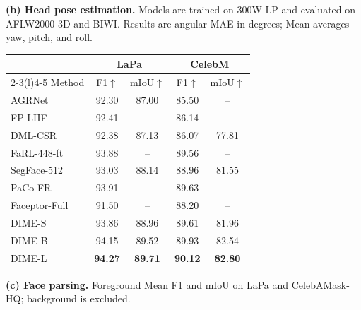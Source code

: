 \documentclass[10pt,journal,compsoc]{IEEEtran}
\newcommand{\BestScore}[1]{\textcolor{DIMEBestText}{#1}}
\newcommand{\SecondScore}[1]{\textcolor{DIMESecondText}{#1}}
\begin{document}
\begin{table}[t]
\begin{minipage}[t]{0.425\textwidth}
    \vspace{0.7mm}
    \parbox[t][1.55cm][t]{\linewidth}{%
      \footnotesize
      \textbf{(b) Head pose estimation.}
      Models are trained on 300W-LP and evaluated on AFLW2000-3D and BIWI.
      Results are angular MAE in degrees; Mean averages yaw, pitch, and roll.
    }
  \end{minipage}
  \hfill
  \begin{minipage}[t]{0.290\textwidth}
    \vspace{0pt}
    \centering
    \GeometryTableFormat

    \begin{tabular*}{\linewidth}{
      @{\extracolsep{\fill}}lcccc@{}
    }
      \toprule
      & \multicolumn{2}{c}{LaPa \cite{liu2020new}}
      & \multicolumn{2}{c}{CelebM \cite{lee2020maskgan}} \\
      \cmidrule(lr){2-3}\cmidrule(l){4-5}
      Method
      & F1$\uparrow$ & mIoU$\uparrow$
      & F1$\uparrow$ & mIoU$\uparrow$ \\
      \midrule
      AGRNet \cite{te2021agrnet}
      & 92.30 & 87.00 & 85.50 & -- \\
      FP-LIIF \cite{sarkar2023parameter}
      & 92.41 & -- & 86.14 & -- \\
      DML-CSR \cite{zheng2022decoupled}
      & 92.38 & 87.13 & 86.07 & 77.81 \\
      FaRL-448-ft \cite{zheng2022general}
      & 93.88 & -- & 89.56 & -- \\
      SegFace-512 \cite{narayan2025segface}
      & 93.03 & 88.14 & 88.96 & 81.55 \\
      PaCo-FR \cite{xie2026paco}
      & 93.91 & -- & 89.63 & -- \\
      Faceptor-Full \cite{qin2024faceptor}
      & 91.50 & -- & 88.20 & -- \\
      \midrule
      DIME-S
      & 93.86 & 88.96 & 89.61 & 81.96 \\
      DIME-B
      & \SecondScore{94.15}
      & \SecondScore{89.52}
      & \SecondScore{89.93}
      & \SecondScore{82.54} \\
      DIME-L
      & \BestScore{\textbf{94.27}}
      & \BestScore{\textbf{89.71}}
      & \BestScore{\textbf{90.12}}
      & \BestScore{\textbf{82.80}} \\
      \bottomrule
    \end{tabular*}

    \vspace{0.7mm}
    \parbox[t][1.55cm][t]{\linewidth}{%
      \footnotesize
      \textbf{(c) Face parsing.}
      Foreground Mean F1 and mIoU on LaPa and CelebAMask-HQ; background is
      excluded.
    }
  \end{minipage}
  \vspace{-4.5em}
\end{table}
\end{document}
